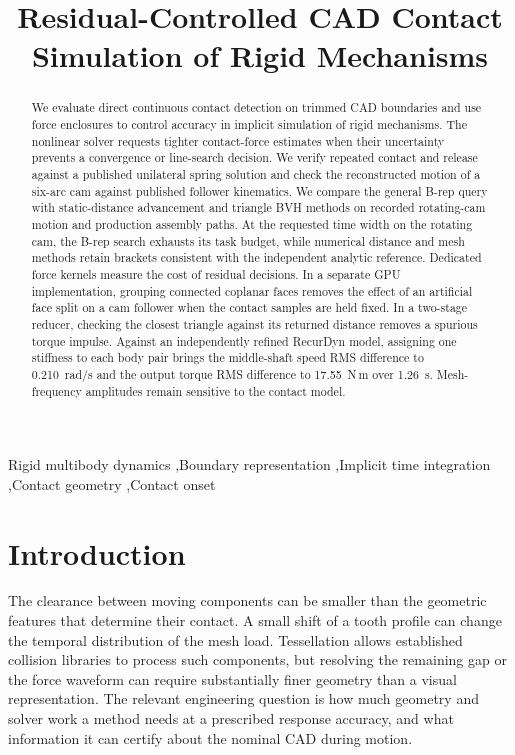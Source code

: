 \documentclass[a4paper,fleqn,longmktitle]{cas-sc}
\newcommand{\manuscripttitle}{Residual-Controlled CAD Contact Simulation of Rigid Mechanisms}
\begin{document}
\title[mode=title]{\manuscripttitle}
\begin{abstract}
We evaluate direct continuous contact detection on trimmed CAD boundaries and use force enclosures to control accuracy in implicit simulation of rigid mechanisms. The nonlinear solver requests tighter contact-force estimates when their uncertainty prevents a convergence or line-search decision. We verify repeated contact and release against a published unilateral spring solution and check the reconstructed motion of a six-arc cam against published follower kinematics. We compare the general B-rep query with static-distance advancement and triangle BVH methods on recorded rotating-cam motion and production assembly paths. At the requested time width on the rotating cam, the B-rep search exhausts its task budget, while numerical distance and mesh methods retain brackets consistent with the independent analytic reference. Dedicated force kernels measure the cost of residual decisions. In a separate GPU implementation, grouping connected coplanar faces removes the effect of an artificial face split on a cam follower when the contact samples are held fixed. In a two-stage reducer, checking the closest triangle against its returned distance removes a spurious torque impulse. Against an independently refined RecurDyn model, assigning one stiffness to each body pair brings the middle-shaft speed RMS difference to 0.210~rad/s and the output torque RMS difference to 17.55~N\,m over 1.26~s. Mesh-frequency amplitudes remain sensitive to the contact model.
\end{abstract}
\begin{keywords}
Rigid multibody dynamics \sep Boundary representation \sep Implicit time integration \sep Contact geometry \sep Contact onset
\end{keywords}
\maketitle
\pagestyle{plain}
\thispagestyle{plain}
\linenumbers

\section{Introduction}
The clearance between moving components can be smaller than the geometric features that determine their contact. A small shift of a tooth profile can change the temporal distribution of the mesh load. Tessellation allows established collision libraries to process such components, but resolving the remaining gap or the force waveform can require substantially finer geometry than a visual representation. The relevant engineering question is how much geometry and solver work a method needs at a prescribed response accuracy, and what information it can certify about the nominal CAD during motion.
\end{document}
